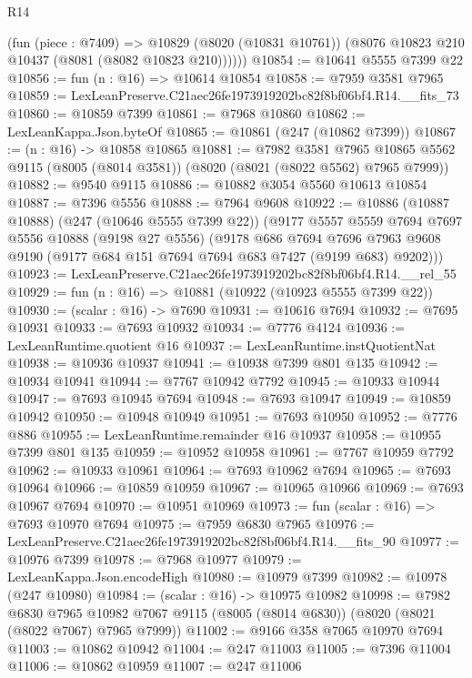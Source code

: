 \begin{lexlean}{R14}
\begin{coremodule}
        (fun (piece : @7409) =>
        @10829 (@8020 (@10831 @10761)) (@8076 @10823 @210 @10437 (@8081 (@8082 @10823 @210))))))
@10854 := @10641 @5555 @7399 @22
@10856 := fun (n : @16) => @10614 @10854
@10858 := @7959 @3581 @7965
@10859 := LexLeanPreserve.C21aec26fe1973919202bc82f8bf06bf4.R14.__fits_73
@10860 := @10859 @7399
@10861 := @7968 @10860
@10862 := LexLeanKappa.Json.byteOf
@10865 := @10861 (@247 (@10862 @7399))
@10867 := (n : @16) -> @10858 @10865
@10881 := @7982
    @3581
    @7965
    @10865
    @5562
    @9115
    (@8005 (@8014 @3581))
    (@8020 (@8021 (@8022 @5562) @7965 @7999))
@10882 := @9540 @9115
@10886 := @10882 @3054 @5560 @10613 @10854
@10887 := @7396 @5556
@10888 := @7964 @9608
@10922 := @10886
    (@10887 @10888)
    (@247 (@10646 @5555 @7399 @22))
    (@9177
      @5557
      @5559
      @7694
      @7697
      @5556
      @10888
      (@9198 @27 @5556)
      (@9178
        @686
        @7694
        @7696
        @7963
        @9608
        @9190
        (@9177 @684 @151 @7694 @7694 @683 @7427 (@9199 @683) @9202)))
@10923 := LexLeanPreserve.C21aec26fe1973919202bc82f8bf06bf4.R14.__rel_55
@10929 := fun (n : @16) => @10881 (@10922 (@10923 @5555 @7399 @22))
@10930 := (scalar : @16) -> @7690
@10931 := @10616 @7694
@10932 := @7695 @10931
@10933 := @7693 @10932
@10934 := @7776 @4124
@10936 := LexLeanRuntime.quotient @16
@10937 := LexLeanRuntime.instQuotientNat
@10938 := @10936 @10937
@10941 := @10938 @7399 @801 @135
@10942 := @10934 @10941
@10944 := @7767 @10942 @7792
@10945 := @10933 @10944
@10947 := @7693 @10945 @7694
@10948 := @7693 @10947
@10949 := @10859 @10942
@10950 := @10948 @10949
@10951 := @7693 @10950
@10952 := @7776 @886
@10955 := LexLeanRuntime.remainder @16 @10937
@10958 := @10955 @7399 @801 @135
@10959 := @10952 @10958
@10961 := @7767 @10959 @7792
@10962 := @10933 @10961
@10964 := @7693 @10962 @7694
@10965 := @7693 @10964
@10966 := @10859 @10959
@10967 := @10965 @10966
@10969 := @7693 @10967 @7694
@10970 := @10951 @10969
@10973 := fun (scalar : @16) => @7693 @10970 @7694
@10975 := @7959 @6830 @7965
@10976 := LexLeanPreserve.C21aec26fe1973919202bc82f8bf06bf4.R14.__fits_90
@10977 := @10976 @7399
@10978 := @7968 @10977
@10979 := LexLeanKappa.Json.encodeHigh
@10980 := @10979 @7399
@10982 := @10978 (@247 @10980)
@10984 := (scalar : @16) -> @10975 @10982
@10998 := @7982
    @6830
    @7965
    @10982
    @7067
    @9115
    (@8005 (@8014 @6830))
    (@8020 (@8021 (@8022 @7067) @7965 @7999))
@11002 := @9166 @358 @7065 @10970 @7694
@11003 := @10862 @10942
@11004 := @247 @11003
@11005 := @7396 @11004
@11006 := @10862 @10959
@11007 := @247 @11006

\end{coremodule}
\end{lexlean}
